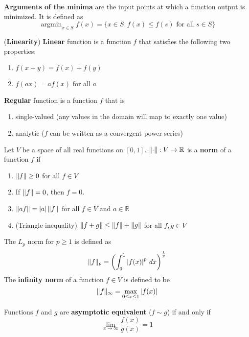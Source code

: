 \documentclass{huhtakm-template-book}
\DeclareMathOperator*{\argmin}{argmin}
\begin{document}
\begin{defn}
    \textbf{Arguments of the minima} are the input points at which a function output is minimized. It is defined as
    \begin{equation*}
        \argmin_{x\in S}f(x)=\{x\in S:f(x)\leq f(s)\text{ for all }s\in S\}
    \end{equation*}
\end{defn}
\begin{defn}(\textbf{Linearity})
    \textbf{Linear} function is a function $f$ that satisfies the following two properties:
    \begin{enumerate}
        \item $f(x+y)=f(x)+f(y)$
        \item $f(ax)=af(x)$ for all $a$
    \end{enumerate}
\end{defn}
\begin{defn}
    \textbf{Regular} function is a function $f$ that is
    \begin{enumerate}
        \item single-valued (any values in the domain will map to exactly one value)
        \item analytic ($f$ can be written as a convergent power series)
    \end{enumerate}
\end{defn}
\begin{defn}
    Let $V$ be a space of all real functions on $[0,1]$. $\lVert{\cdot}\rVert:V\to\mathbb{R}$ is a \textbf{norm} of a function $f$ if
    \begin{enumerate}
        \item $\lVert{f}\rVert\geq 0$ for all $f\in V$
        \item If $\lVert{f}\rVert=0$, then $f=0$.
        \item $\lVert{af}\rVert=\left|{a}\right|\lVert{f}\rVert$ for all $f\in V$ and $a\in\mathbb{R}$
        \item (Triangle inequality) $\lVert{f+g}\rVert\leq\lVert{f}\rVert+\lVert{g}\rVert$ for all $f,g\in V$
    \end{enumerate}
    The $L_{p}$ norm for $p\geq 1$ is defined as
    \begin{equation*}
        \lVert{f}\rVert_{p}=\left(\int_{0}^{1}\left|{f(x)}\right|^{p}\,dx\right)^{\frac{1}{p}}
    \end{equation*}
    The \textbf{infinity norm} of a function $f\in V$ is defined to be
    \begin{equation*}
        \lVert{f}\rVert_{\infty}=\max_{0\leq x\leq 1}\left|{f(x)}\right|
    \end{equation*}
\end{defn}
\begin{defn}
    Functions $f$ and $g$ are \textbf{asymptotic equivalent} ($f\sim g$) if and only if
    \begin{equation*}
        \lim_{x\to\infty}\frac{f(x)}{g(x)}=1
    \end{equation*}
\end{defn}
\end{document}
